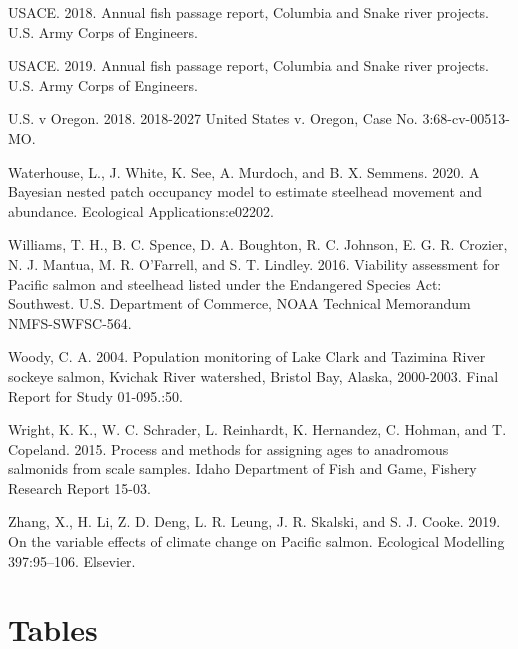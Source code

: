 \documentclass[
  12pt,
]{article}
\begin{document}
\leavevmode\hypertarget{ref-USACE2018}{}%
USACE. 2018. Annual fish passage report, Columbia and Snake river projects. U.S. Army Corps of Engineers.

\leavevmode\hypertarget{ref-USACE2019}{}%
USACE. 2019. Annual fish passage report, Columbia and Snake river projects. U.S. Army Corps of Engineers.

\leavevmode\hypertarget{ref-USOregon2018}{}%
U.S. v Oregon. 2018. 2018-2027 United States v. Oregon, Case No. 3:68-cv-00513-MO.

\leavevmode\hypertarget{ref-Waterhouse2020}{}%
Waterhouse, L., J. White, K. See, A. Murdoch, and B. X. Semmens. 2020. A Bayesian nested patch occupancy model to estimate steelhead movement and abundance. Ecological Applications:e02202.

\leavevmode\hypertarget{ref-Williams2016}{}%
Williams, T. H., B. C. Spence, D. A. Boughton, R. C. Johnson, E. G. R. Crozier, N. J. Mantua, M. R. O'Farrell, and S. T. Lindley. 2016. Viability assessment for Pacific salmon and steelhead listed under the Endangered Species Act: Southwest. U.S. Department of Commerce, NOAA Technical Memorandum NMFS-SWFSC-564.

\leavevmode\hypertarget{ref-Woody2004}{}%
Woody, C. A. 2004. Population monitoring of Lake Clark and Tazimina River sockeye salmon, Kvichak River watershed, Bristol Bay, Alaska, 2000-2003. Final Report for Study 01-095.:50.

\leavevmode\hypertarget{ref-Wright2015}{}%
Wright, K. K., W. C. Schrader, L. Reinhardt, K. Hernandez, C. Hohman, and T. Copeland. 2015. Process and methods for assigning ages to anadromous salmonids from scale samples. Idaho Department of Fish and Game, Fishery Research Report 15-03.

\leavevmode\hypertarget{ref-Zhang2019}{}%
Zhang, X., H. Li, Z. D. Deng, L. R. Leung, J. R. Skalski, and S. J. Cooke. 2019. On the variable effects of climate change on Pacific salmon. Ecological Modelling 397:95--106. Elsevier.

\newpage

\hypertarget{tables}{%
\section{Tables}\label{tables}}
\end{document}
